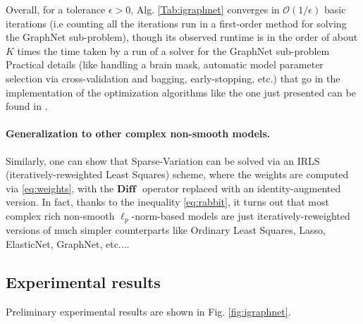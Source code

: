 Overall, for a
tolerance $\epsilon > 0$, Alg. \ref{Tab:igraphnet} converges
in $\mathcal O(1/\epsilon)$ basic
iterations (i.e counting all the iterations run in a first-order
method for solving the GraphNet sub-problem), though its observed
runtime is in the order of about $K$ times the time taken by a run of
a solver for the GraphNet sub-problem
Practical details (like handling a brain mask, automatic model
parameter selection via cross-validation and bagging, early-stopping,
etc.) that go in the implementation of the optimization algorithms like the
one just presented can be found in
\cite{dohmatob2014benchmarking}.

\paragraph*{Generalization to other complex non-smooth models.}
Similarly, one can show that Sparse-Variation
\citep{eickenberg2015total} can be solved via an IRLS
(iteratively-reweighted Least Squares) scheme, where the weights are
computed via \eqref{eq:weights}, with the $\textbf{Diff }$ operator replaced
with an identity-augmented version. In fact, thanks to the inequality
\eqref{eq:rabbit}, it turns out that most
complex rich non-smooth $\ell_p$-norm-based models are just
iteratively-reweighted versions of much simpler counterparts like
Ordinary Least Squares, Lasso, ElasticNet, GraphNet, etc....

\subsection{Experimental results}
Preliminary experimental results are shown in Fig. \ref{fig:igraphnet}.

